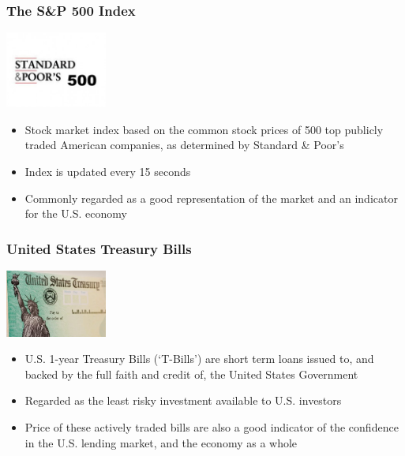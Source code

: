 \documentclass[compress,handout,10pt]{beamer}
\let\olditem\item
\renewcommand{\item}{\setlength{\itemsep}{0.5\baselineskip}\olditem}
\begin{document}
\begin{frame}
    \frametitle{The S\&P 500 Index}
\begin{center}
            \includegraphics[width=0.25\textwidth]{images/SP500.jpeg}
\end{center}
\begin{itemize}
\item  Stock market index based on the common stock prices of 500 top publicly traded American companies, as determined by Standard \& Poor's
\item Index is updated every 15 seconds
\item Commonly regarded as a good representation of the market and an indicator for the U.S. economy
\end{itemize}
\end{frame}

\begin{frame}
    \frametitle{United States Treasury Bills}
\begin{center}
            \includegraphics[width=0.25\textwidth]{images/ustreasury.jpeg}
\end{center}
\begin{itemize}
\item  U.S. 1-year Treasury Bills (`T-Bills') are short term loans issued to, and backed by the full faith and credit of, the United States Government
\item Regarded as the least risky investment available to U.S. investors
\item Price of these actively traded bills are also a good indicator of the confidence in the U.S. lending market, and the economy as a whole
\end{itemize}
\end{frame}
\end{document}
